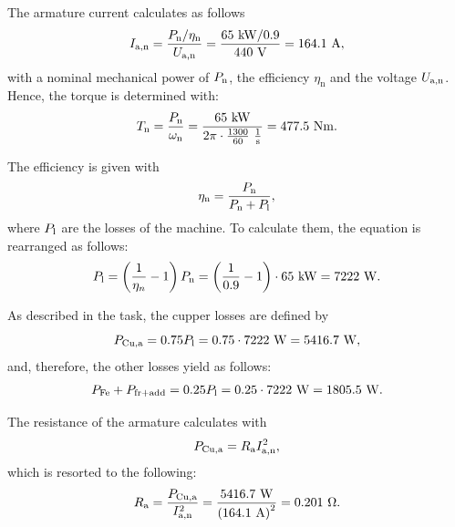 \begin{solutionblock}
    The armature current calculates as follows
    \begin{equation}
        I_{\mathrm{a,n}} = \frac{\Pn / \eta_{\mathrm{n}}}{\Uan}
        = \frac{65 \ \si{kW} / 0.9}{440 \ \si{V}}
        = 164.1 \ \si{A},
    \end{equation}
    with a nominal mechanical power of $\Pn$, the efficiency $\eta_{\mathrm{n}}$ and the voltage $\Uan$.
    Hence, the torque is determined with:
    \begin{equation}
        \Tn = \frac{\Pn}{\omega_{\mathrm{n}}} 
        = \frac{65 \ \si{kW}}{2 \pi \cdot \frac{1300}{60} \ \si{\frac{1}{s}}}
        = 477.5 \ \si{Nm}.
    \end{equation}

    The efficiency is given with
    \begin{equation}
        \eta_{\mathrm{n}} = \frac{\Pn}{\Pn + \Pl},
    \end{equation}
    where $\Pl$ are the losses of the machine. To calculate them, the equation is rearranged as follows:
    \begin{equation}
        \Pl = \left(\frac{1}{\eta_{n}} - 1 \right) \Pn
        = \left(\frac{1}{0.9}-1 \right) \cdot 65\ \si{kW}
        = 7222 \ \si{W}.
    \end{equation}

    As described in the task, the cupper losses are defined by
    \begin{equation}
        P_{\mathrm{Cu,a}} = 0.75 \Pl
        = 0.75 \cdot 7222 \ \si{W} 
        = 5416.7\ \si{W},
    \end{equation}
    and, therefore, the other losses yield as follows:
    \begin{equation}
        P_{\mathrm{Fe}} + P_{\mathrm{fr + add}} = 0.25 \Pl 
        = 0.25 \cdot 7222 \ \si{W}
        = 1805.5 \ \si{W}.
    \end{equation}

    The resistance of the armature calculates with
    \begin{equation}
        P_{\mathrm{Cu,a}} = \Ra I_{\mathrm{a,n}}^{2},
    \end{equation}
    which is resorted to the following:
    \begin{equation}
        \Ra = \frac{P_{\mathrm{Cu,a}}}{I_{\mathrm{a,n}}^{2}}
        = \frac{5416.7 \ \si{W}}{\left(164.1 \ \si{A}\right)^2}
        = 0.201 \ \si{\Omega}.
    \end{equation}


\end{solutionblock}
